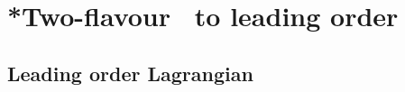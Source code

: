 \section{*Two-flavour \chpt\ to leading order}
\label{section: two-flavor chpt to leading order}





\subsection{Leading order Lagrangian}
\label{section: leading order}

